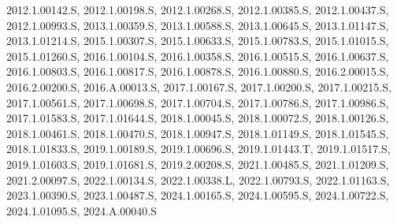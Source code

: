 \mbox{2012.1.00142.S}, \mbox{2012.1.00198.S}, \mbox{2012.1.00268.S}, \mbox{2012.1.00385.S}, \mbox{2012.1.00437.S}, \mbox{2012.1.00993.S}, \mbox{2013.1.00359.S}, \mbox{2013.1.00588.S}, \mbox{2013.1.00645.S}, \mbox{2013.1.01147.S}, \mbox{2013.1.01214.S}, \mbox{2015.1.00307.S}, \mbox{2015.1.00633.S}, \mbox{2015.1.00783.S}, \mbox{2015.1.01015.S}, \mbox{2015.1.01260.S}, \mbox{2016.1.00104.S}, \mbox{2016.1.00358.S}, \mbox{2016.1.00515.S}, \mbox{2016.1.00637.S}, \mbox{2016.1.00803.S}, \mbox{2016.1.00817.S}, \mbox{2016.1.00878.S}, \mbox{2016.1.00880.S}, \mbox{2016.2.00015.S}, \mbox{2016.2.00200.S}, \mbox{2016.A.00013.S}, \mbox{2017.1.00167.S}, \mbox{2017.1.00200.S}, \mbox{2017.1.00215.S}, \mbox{2017.1.00561.S}, \mbox{2017.1.00698.S}, \mbox{2017.1.00704.S}, \mbox{2017.1.00786.S}, \mbox{2017.1.00986.S}, \mbox{2017.1.01583.S}, \mbox{2017.1.01644.S}, \mbox{2018.1.00045.S}, \mbox{2018.1.00072.S}, \mbox{2018.1.00126.S}, \mbox{2018.1.00461.S}, \mbox{2018.1.00470.S}, \mbox{2018.1.00947.S}, \mbox{2018.1.01149.S}, \mbox{2018.1.01545.S}, \mbox{2018.1.01833.S}, \mbox{2019.1.00189.S}, \mbox{2019.1.00696.S}, \mbox{2019.1.01443.T}, \mbox{2019.1.01517.S}, \mbox{2019.1.01603.S}, \mbox{2019.1.01681.S}, \mbox{2019.2.00208.S}, \mbox{2021.1.00485.S}, \mbox{2021.1.01209.S}, \mbox{2021.2.00097.S}, \mbox{2022.1.00134.S}, \mbox{2022.1.00338.L}, \mbox{2022.1.00793.S}, \mbox{2022.1.01163.S}, \mbox{2023.1.00390.S}, \mbox{2023.1.00487.S}, \mbox{2024.1.00165.S}, \mbox{2024.1.00595.S}, \mbox{2024.1.00722.S}, \mbox{2024.1.01095.S}, \mbox{2024.A.00040.S}
